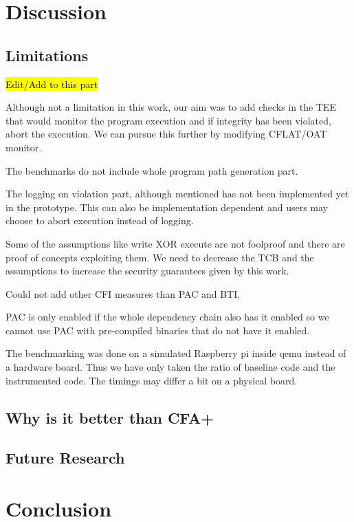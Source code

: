 \documentclass[a4paper, nobind]{templates/ociamthesis}
\begin{document}
\chapter{Discussion}\label{discussion}

\minitoc 

\section{Limitations}\label{limitations-2}

\hl{Edit/Add to this part}

Although not a limitation in this work, our aim was to add checks in the TEE
that would monitor the program execution and if integrity has been violated,
abort the execution. We can pursue this further by modifying CFLAT/OAT monitor.

The benchmarks do not include whole program path generation part.

The logging on violation part, although mentioned has not been implemented yet
in the prototype. This can also be implementation dependent and users may choose
to abort execution instead of logging.

Some of the assumptions like write XOR execute are not foolproof and there are
proof of concepts exploiting them. We need to decrease the TCB and the
assumptions to increase the security guarantees given by this work.

Could not add other CFI measures than PAC and BTI.

PAC is only enabled if the whole dependency chain also has it enabled so we
cannot use PAC with pre-compiled binaries that do not have it enabled.

The benchmarking was done on a simulated Raspberry pi inside qemu instead of a
hardware board. Thus we have only taken the ratio of baseline code and the
instrumented code. The timings may differ a bit on a physical board.

\section{Why is it better than CFA+}\label{why-is-it-better-than-cfa}

\section{Future Research}\label{future-research}

\chapter*{Conclusion}\label{conclusion}
\end{document}
